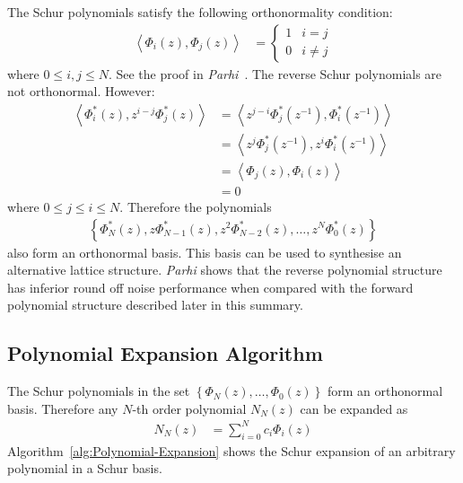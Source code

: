 \documentclass[a4paper,twoside,10pt,english]{report}
\begin{document}
The Schur polynomials satisfy the following orthonormality condition:
\begin{align*}
\left\langle \Phi_{i}\left(z\right),\Phi_{j}\left(z\right)\right\rangle  & = \begin{cases}
1 & i=j\\
0 & i\neq j
\end{cases}
\end{align*}
where $0\leq i,j\leq N$. See the proof in 
\emph{Parhi}~\cite[Appendix D]{Parhi_VLSIDigitalSignalProcessingSystems}.
The reverse Schur polynomials are not orthonormal. However:
\begin{align*}
\left\langle \Phi_{i}^{*}\left(z\right),z^{i-j}\Phi_{j}^{*}\left(z\right)\right\rangle  & = \left\langle z^{j-i}\Phi_{j}^{*}\left(z^{-1}\right),\Phi_{i}^{*}\left(z^{-1}\right)\right\rangle \\
 & = \left\langle z^{j}\Phi_{j}^{*}\left(z^{-1}\right),z^{i}\Phi_{i}^{*}\left(z^{-1}\right)\right\rangle \\
 & = \left\langle \Phi_{j}\left(z\right),\Phi_{i}\left(z\right)\right\rangle \\
 & = 0
\end{align*}
where $0\leq j\leq i\leq N$. Therefore the polynomials
\begin{align*}
\left\{ \Phi_{N}^{*}\left(z\right),z\Phi_{N-1}^{*}\left(z\right),z^{2}\Phi_{N-2}^{*}\left(z\right),\ldots,z^{N}\Phi_{0}^{*}\left(z\right)\right\}
\end{align*}
also form an orthonormal basis. This basis can be used to synthesise
an alternative lattice structure. \emph{Parhi} 
\cite[Section 12.7.2]{Parhi_VLSIDigitalSignalProcessingSystems}
shows that the reverse polynomial structure has inferior round off
noise performance when compared with the forward polynomial structure
described later in this summary.
\subsection{Polynomial Expansion Algorithm}
The Schur polynomials in the set 
$\left\{ \Phi_{N}\left(z\right),\ldots,\Phi_{0}\left(z\right)\right\}$
form an orthonormal basis. Therefore any $N$-th order polynomial
$N_{N}\left(z\right)$ can be expanded as
\begin{align*}
N_{N}\left(z\right) & = \sum_{i=0}^{N}c_{i}\Phi_{i}\left(z\right)
\end{align*}
Algorithm~\ref{alg:Polynomial-Expansion} shows the Schur expansion of an
arbitrary polynomial in a Schur basis.
 
\end{document}
